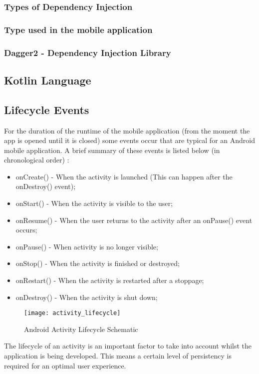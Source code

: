 \subsubsection{Types of Dependency Injection}
\subsubsection{Type used in the mobile application}
\subsubsection{Dagger2 - Dependency Injection Library}
\subsection{Kotlin Language}
\subsection{Lifecycle Events}
For the duration of the runtime of the mobile application (from the moment the app is opened until it is closed) some events occur that are typical for an Android mobile application. A brief summary of these events is listed below (in chronological order) \cite{AndroidDeveloper2019}:
\begin{itemize}
\item onCreate() - When the activity is launched (This can happen after the onDestroy() event);
\item onStart() - When the activity is visible to the user;
\item onResume() - When the user returns to the activity after an onPause() event occurs;
\item onPause() - When activity is no longer visible;
\item onStop() - When the activity is finished or destroyed;
\item onRestart() - When the activity is restarted after a stoppage;
\item onDestroy() - When the activity is shut down;
\end{itemize}
\begin{figure}[H]
\centering
\texttt{[image: activity\_lifecycle]}
\caption{Android Activity Lifecycle Schematic~\cite{AndroidDeveloper2019}}
\end{figure}
The lifecycle of an activity is an important factor to take into account whilst the application is being developed. This means a certain level of persistency is required for an optimal user experience.
